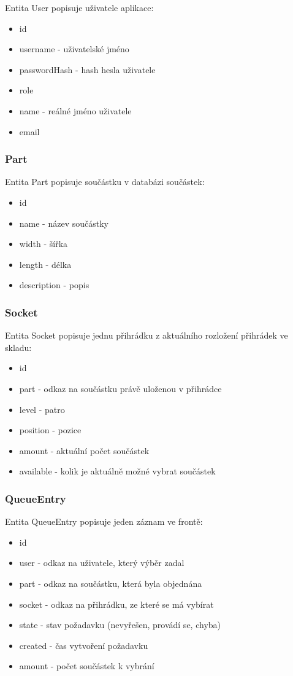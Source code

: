 \documentclass[12pt, a4paper, oneside]{article}
\begin{document}
Entita User popisuje uživatele aplikace:
\begin{itemize}
\item id
\item username - uživatelské jméno
\item passwordHash - hash hesla uživatele
\item role
\item name - reálné jméno uživatele
\item email
\end{itemize}

\subsubsection{Part}

Entita Part popisuje součástku v databázi součástek:
\begin{itemize}
\item id
\item name - název součástky
\item width - šířka
\item length - délka
\item description - popis
\end{itemize}

\subsubsection{Socket}

Entita Socket popisuje jednu přihrádku z aktuálního rozložení přihrádek ve skladu:
\begin{itemize}
\item id
\item part - odkaz na součástku právě uloženou v přihrádce
\item level - patro
\item position - pozice
\item amount - aktuální počet součástek
\item available - kolik je aktuálně možné vybrat součástek
\end{itemize}


\subsubsection{QueueEntry}

Entita QueueEntry popisuje jeden záznam ve frontě:
\begin{itemize}
\item id
\item user - odkaz na uživatele, který výběr zadal
\item part - odkaz na součástku, která byla objednána
\item socket - odkaz na přihrádku, ze které se má vybírat
\item state - stav požadavku (nevyřešen, provádí se, chyba)
\item created - čas vytvoření požadavku
\item amount - počet součástek k vybrání
\end{itemize}
\end{document}
